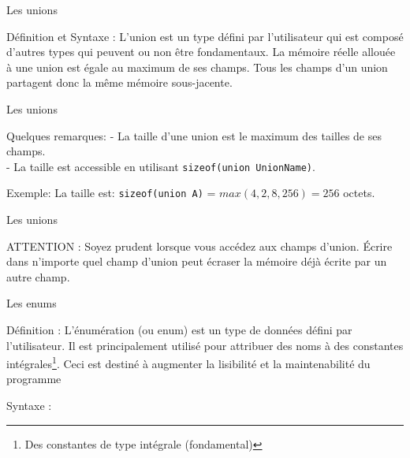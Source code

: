  	\begin{frame}{Les unions}
  		\begin{block}{Définition et Syntaxe :}
  			L'union est un type défini par l'utilisateur qui est composé d'autres types qui peuvent ou non être fondamentaux. La mémoire réelle allouée à une union est égale au maximum de ses champs. Tous les champs d'un union partagent donc la même mémoire sous-jacente.
  			\unionSyntax
  		\end{block}

  	\end{frame}
  	
  	\begin{frame}{Les unions}
  		\begin{alertblock}{Quelques remarques:}
  			- La taille d'une union est le maximum des tailles de ses champs. \\
  			- La taille est accessible en utilisant \alert{\texttt{sizeof(union UnionName)}}. \\
  		\end{alertblock}
  		\begin{exampleblock}{Exemple:}
  			\unionExmp
  			La taille est: \texttt{sizeof(union A)} = $max(4, 2, 8, 256) = 256$ octets.
  		\end{exampleblock}
  	\end{frame}

	\begin{frame}{Les unions}
		\begin{alertblock}{ATTENTION : Soyez prudent lorsque vous accédez aux champs d'union. Écrire dans n'importe quel champ d'union peut écraser la mémoire déjà écrite par un autre champ.}
		\unionExmpDanger
		\end{alertblock}
	\end{frame}
	
	    

	\begin{frame}{Les enums}  	
		\begin{block}{Définition :}
			L'énumération (ou enum) est un type de données défini par l'utilisateur. Il est principalement utilisé pour attribuer des noms à des \alert{constantes intégrales}\footnote[frame]{Des constantes de type intégrale (fondamental)}. Ceci est destiné à augmenter la lisibilité et la maintenabilité du programme
		\end{block}
		\begin{block}{Syntaxe :}
			\enumSyntax
		\end{block}
	\end{frame}
	
